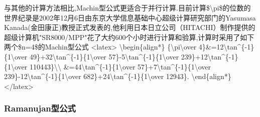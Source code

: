 \documentclass[
]{article}
\begin{document}
与其他的计算方法相比,Machin型公式更适合于并行计算.目前计算\$\textbackslash pi\$的位数的世界纪录是2002年12月6日由东京大学信息基础中心超级计算研究部门的Yasumasa
Kanada(金田康正)教授正式发表的,他利用日本日立公司（HITACHI）制作提供的超级计算机"SR8000/MPP"花了大约600个小时进行计算和验算,计算时采用了如下两个\$n=4\$的Machin型公式
\textless latex\textgreater{} \textbackslash begin\{align*\}
\{\textbackslash pi\textbackslash over
4\}\&=12\textbackslash tan\^{}\{-1\}\{1\textbackslash over
49\}+32\textbackslash tan\^{}\{-1\}\{1\textbackslash over
57\}-5\textbackslash tan\^{}\{-1\}\{1\textbackslash over
239\}+12\textbackslash tan\^{}\{-1\}\{1\textbackslash over
110443\}\textbackslash\textbackslash{}
\&=44\textbackslash tan\^{}\{-1\}\{1\textbackslash over
57\}+7\textbackslash tan\^{}\{-1\}\{1\textbackslash over
239\}-12\textbackslash tan\^{}\{-1\}\{1\textbackslash over
682\}+24\textbackslash tan\^{}\{-1\}\{1\textbackslash over 12943\}.
\textbackslash end\{align*\} \textless/latex\textgreater{}

\hypertarget{ramanujanux578bux516cux5f0f}{%
\subsubsection{Ramanujan型公式}\label{ramanujanux578bux516cux5f0f}}
\end{document}

